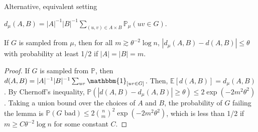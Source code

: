 \documentclass{beamer}
\newcommand{\1}{\mathbbm{1}}
\newcommand{\indicator}[1]{\1_{[#1]}}
\newcommand{\Exp}[1]{\mathbb{E}\left [#1 \right ]}
\newcommand{\Prob}{\mathbb{P}}
\begin{document}
\begin{frame}{Alternative, equivalent setting}
  \begin{definition}
    $d_\mu(A, B) = |A|^{-1} |B|^{-1} \sum_{(u, v) \in A \times B} \Prob_\mu(uv \in G)$.
  \end{definition}

  \pause

  \begin{lemma}
    If $G$ is sampled from $\mu$, then for all $m \gtrsim \theta^{-2} \log n$, $|d_\mu(A,
      B) - d(A, B)| \le \theta$ with probability at least 1/2 if $|A| = |B| = m$.
  \end{lemma}

  \pause

  \begin{proof}
    \pause
    If $G$ is sampled from $\Prob$, then $d(A, B) = |A|^{-1} |B|^{-1} \sum_{uv}
      \indicator{uv \in G}$.
    \pause
    Then, $\Exp{d(A, B)} = d_\mu(A, B)$.
    \pause
    By Chernoff's inequality, $\Prob(|d(A, B) - d_\mu(A, B)| \ge \theta) \le 2\exp(-2
      m^2 \theta^2)$.
    \pause
    Taking a union bound over the choices of $A$ and $B$, the probability of $G$
    failing the lemma is $\Prob(G \text{ bad}) \le 2 {n \choose m}^2 \exp(-2 m^2
      \theta^2)$,
    \pause
    which is less than 1/2 if $m \ge C \theta^{-2} \log n$ for some constant $C$.
  \end{proof}
\end{frame}
\end{document}
